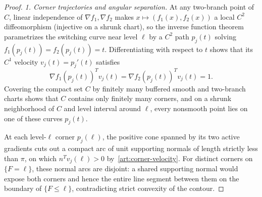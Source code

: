 \begin{proof}
\emph{1. Corner trajectories and angular separation.}
At any two-branch point of $C$, linear independence of $\nabla f_1,\nabla f_2$
makes $x\mapsto(f_1(x),f_2(x))$ a local $C^2$ diffeomorphism (injective on a
shrunk chart), so the inverse
function theorem parametrizes the switching curve near level $\ell$ by a $C^2$
path $p_j(t)$ solving $f_1(p_j(t))=f_2(p_j(t))=t$. Differentiating with respect
to $t$ shows that its $C^1$ velocity $v_j(t)=p_j'(t)$ satisfies
\begin{equation}\label{art:corner-velocity}
 \nabla f_1(p_j(t))^Tv_j(t)=\nabla f_2(p_j(t))^Tv_j(t)=1.
\end{equation}
Covering the compact set $C$ by finitely many buffered smooth and two-branch
charts shows that $C$ contains only finitely many corners, and on a shrunk
neighborhood of $C$ and level interval around $\ell$, every nonsmooth point lies
on one of these curves $p_j(t)$.

At each level-$\ell$ corner $p_j(\ell)$, the positive cone spanned by its two
active gradients cuts out a compact arc of unit supporting normals of length
strictly less than $\pi$, on which $n^Tv_j(\ell)>0$ by~\eqref{art:corner-velocity}.
For distinct corners on $\{F=\ell\}$, these normal arcs are disjoint: a shared
supporting normal would expose both corners and hence the entire line segment
between them on the boundary of $\{F\le\ell\}$, contradicting strict convexity
of the contour.


\end{proof}
